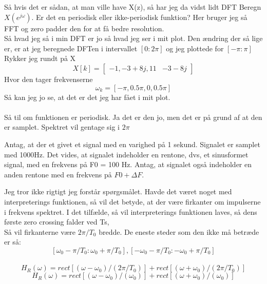 \begin{rubrik}[Eksamenssæt 2021]
\begin{eksamensOpgave}
\begin{UnderOpgave}
            Så hvis det er sådan, at man ville have X(z), så har jeg da vidst lidt DFT
            Beregn $X(e^{j\omega})$. Er det en periodisk eller ikke-periodisk funktion?
            Her bruger jeg så FFT og zero padder den for at få bedre resolution.
            \\
            Så hvad jeg så i min DFT er jo så hvad jeg ser i mit plot. Den ændring der så lige er, er at jeg beregnede DFTen i intervallet $[0:2\pi]$ og jeg plottede for $[-\pi:\pi]$
            Rykker jeg rundt på X 
            \[X[k] = [\begin{array}{cccc} -1, -3 + 8j, 11 & -3 - 8j \end{array}]\]
            Hvor den tager frekvenserne 
            \[\omega_k = [-\pi, 0.5\pi, 0, 0.5\pi]\]
            Så kan jeg jo se, at det er det jeg har fået i mit plot. \\\\
            Så til om funktionen er periodisk. Ja det er den jo, men det er på grund af at den er samplet. Spektret vil gentage sig i $2\pi$
        \end{UnderOpgave}
    \end{eksamensOpgave}
    \begin{eksamensOpgave}
        Antag, at der et givet et signal med en varighed på 1 sekund. Signalet er samplet med 1000Hz. 
        Det vides, at signalet indeholder en rentone, dvs, et sinusformet signal, med en frekvens
        på F0 = 100 Hz. Antag, at signalet også indeholder en anden rentone med en frekvens på
        $F0 + \Delta F$. 
        \begin{UnderOpgave}
            Jeg tror ikke rigtigt jeg forstår spørgsmålet. Havde det været noget med interpreterings funktionen, 
            så vil det betyde, at der være firkanter om impulserne i frekvens spektret. 
            I det tilfælde, så vil interpreterings funktionen laves, så dens første zero crossing falder ved Ts, \\
            Så vil firkanterne være $2\pi/T_0$ bredde. De eneste steder som den ikke må betræde er så: 
            \[[\omega_0 - \pi/T_0: \omega_0 + \pi/T_0], [-\omega_0 -\pi/T_0 : -\omega_0 + \pi/T_0]\]\\
            \[H_R(\omega) = rect[(\omega - \omega_0)/(2\pi/T_0)] + rect[(\omega + \omega_0)/(2\pi/T_0)]\]
            \[H_R(\omega) = rect[(\omega - \omega_0)/(\omega_0)] + rect[(\omega + \omega_0)/(\omega_0)]\]

\end{UnderOpgave}
\end{eksamensOpgave}
\end{rubrik}
